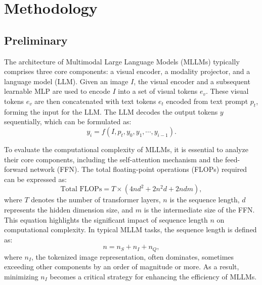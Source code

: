 \section{Methodology}
\subsection{Preliminary}
\label{sec:preliminary}
The architecture of Multimodal Large Language Models (MLLMs) typically comprises three core components: a visual encoder, a modality projector, and a language model (LLM). Given an image $I$, the visual encoder and a subsequent learnable MLP are used to encode $I$ into a set of visual tokens $e_v$. These visual tokens $e_v$ are then concatenated with text tokens $e_t$ encoded from text prompt $p_t$, forming the input for the LLM. The LLM decodes the output tokens $y$ sequentially, which can be formulated as:
\begin{equation}
\label{eq1}
    y_i = f(I, p_t, y_0, y_1, \cdots, y_{i-1}).
\end{equation}

To evaluate the computational complexity of MLLMs, it is essential to analyze their core components, including the self-attention mechanism and the feed-forward network (FFN). The total floating-point operations (FLOPs) required can be expressed as:  
\begin{equation}
\text{Total FLOPs} = T \times (4nd^2 + 2n^2d + 2ndm),
\end{equation}  
where $T$ denotes the number of transformer layers, $n$ is the sequence length, $d$ represents the hidden dimension size, and $m$ is the intermediate size of the FFN.  
This equation highlights the significant impact of sequence length $n$ on computational complexity. In typical MLLM tasks, the sequence length is defined as: 
\begin{equation}
    n = n_S + n_I + n_Q, 
\end{equation}
where $n_I$, the tokenized image representation, often dominates, sometimes exceeding other components by an order of magnitude or more.  
As a result, minimizing $n_I$ becomes a critical strategy for enhancing the efficiency of MLLMs.

